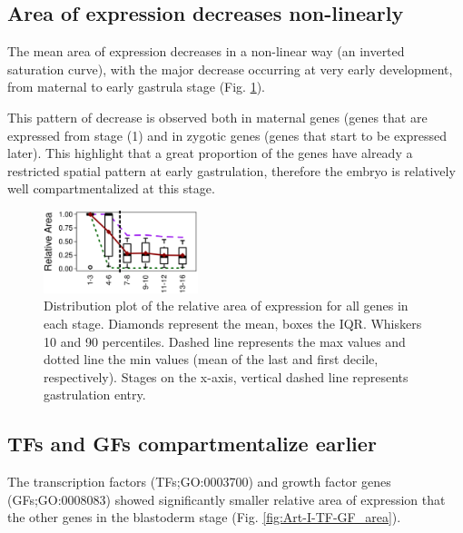 \subsection{Area of expression decreases non-linearly}

The mean area of expression decreases in a non-linear way (an inverted saturation curve), with the major decrease occurring at very early development, from maternal to early gastrula stage (Fig. \ref{fig:Art-I-Area}).

This pattern of decrease is observed both in maternal genes (genes that are expressed from stage (1) and in zygotic genes (genes that start to be expressed later).
This highlight that a great proportion of the genes have already a restricted spatial pattern at early gastrulation, therefore the embryo is relatively well compartmentalized at this stage.


\begin{figure}[h]
  \includegraphics[width=0.4\textwidth]{./Images/Art-I/area.png}
  \centering
  \caption{Distribution plot of the relative area of expression for all genes in each stage. Diamonds represent the mean, boxes the IQR. Whiskers 10 and 90 percentiles. Dashed line represents the max values and dotted line the min values (mean of the last and first decile, respectively). Stages on the x-axis, vertical dashed line represents gastrulation entry.}
  \label{fig:Art-I-Area}
\end{figure}


\subsection{TFs and GFs compartmentalize earlier}
The transcription factors (TFs;GO:0003700) and growth factor genes (GFs;GO:0008083) showed significantly smaller relative area of expression that the other genes in the blastoderm stage (Fig. \ref{fig:Art-I-TF-GF_area}).
	

